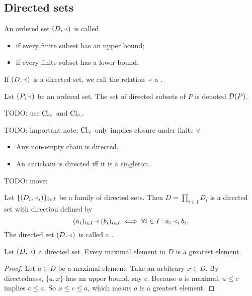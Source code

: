 \subsection{Directed sets}
\begin{definition}
An ordered set $\left( D,\Yleft \right)$ is called
\begin{itemize}
\item {} if every finite subset has an upper bound;
\item {} if every finite subset has a lower bound.
\end{itemize}
If $(D,\Yleft)$ is a directed set, we call the relation $\Yleft$ a .

Let $\left( P,\Yleft \right)$ be an ordered set. The set of directed subsets of $P$ is denoted $\operatorname{\mathcal{D}}(P)$.
\end{definition}
TODO: use $\operatorname{Cl}_\vee$ and $\operatorname{Cl}_\wedge$.

TODO: important note: $\operatorname{Cl}_\vee$ only implies closure under finite $\vee$

\begin{example}
\begin{itemize}
\item Any non-empty chain is directed.
\item An antichain is directed iff it is a singleton.
\end{itemize}
\end{example}

TODO: move:
\begin{proposition}
Let $\{(D_i,\Yleft_i)\}_{i\in I}$ be a family of directed sets. Then $D= \prod_{i\in I}D_i$ is a directed set with direction defined by
\[ (a_i)_{i\in I} \Yleft (b_i)_{i\in I} \iff \forall i\in I: a_i\Yleft_i b_i. \]
The directed set $(D,\Yleft)$ is called a .
\end{proposition}

\begin{proposition}
Let $\left( D, \Yleft \right)$ a directed set. Every maximal element in $D$ is a greatest element.
\end{proposition}
\begin{proof}
Let $a\in D$ be a maximal element. Take an arbitrary $x\in D$. By directedness, $\{a,x\}$ has an upper bound, say $c$. Because $a$ is maximal, $a\leq c$ implies $c\leq a$. So $x\leq c\leq a$, which means $a$ is a greatest element.
\end{proof}


